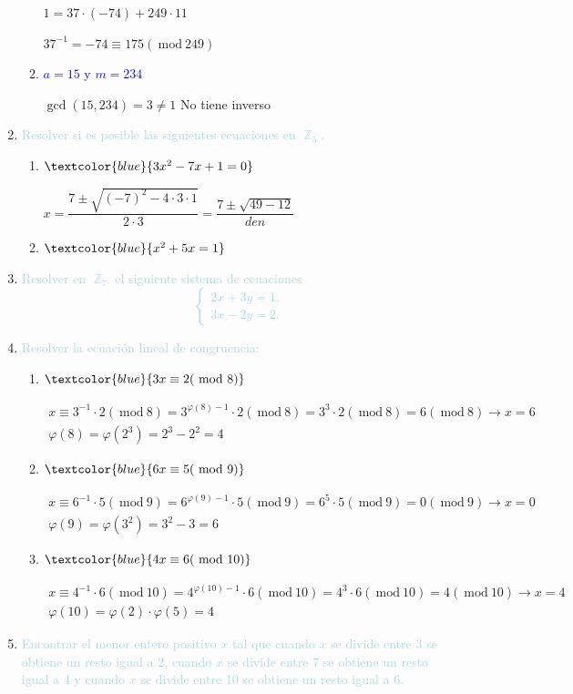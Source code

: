 \documentclass{article}
\newcommand{\lb}[1]{\textcolor{lightblue}{#1}}
\newcommand{\db}[1]{\textcolor{blue}{#1}}
\DeclareMathOperator{\Z}{\mathbb{Z}}
\renewcommand{\mod}{~\mathrm{mod}~}
\begin{document}
\begin{enumerate}[label=\color{red}\textbf{\arabic*)}, leftmargin=*]
\begin{enumerate}[label=\color{red}\alph*)]
        $1=37\cdot(-74)+249\cdot11$
        
        $37^{-1}=-74\equiv175(\mod249)$
		\item \db{$a=15$ y $m=234$}
        
        $\gcd(15,234)=3\neq1$ No tiene inverso
	\end{enumerate}
	\item \lb{Resolver si es posible las siguientes ecuaciones en $\Z_5$.}
	\begin{enumerate}[label=\color{red}\alph*)]
		\item $\db{3x^2-7x+1=0}$
        
        $x=\dfrac{7\pm\sqrt{(-7)^2-4\cdot3\cdot1}}{2\cdot3}=\dfrac{7\pm\sqrt{49-12}}{den}$
		\item $\db{x^2+5x=1}$
	\end{enumerate}
	
	\item \lb{Resolver en $\Z_7$ el siguiente sistema de ecuaciones \[ \begin{cases}
			2x+3y=1,\\
			3x-2y=2.
		\end{cases} \]}
	\item \lb{Resolver la ecuación lineal de congruencia:}
	\begin{enumerate}[label=\color{red}\alph*)]
		\item $\db{3x\equiv2(\mod 8)}$
		
		$\begin{array}{l}
			x\equiv3^{-1}\cdot2(\mod8)=3^{\varphi(8)-1}\cdot2(\mod8)=3^3\cdot2(\mod8)=6(\mod8)\longrightarrow x=6\\
			\varphi(8)=\varphi(2^3)=2^3-2^2=4
		\end{array}$
		
		\item $\db{6x\equiv 5(\mod 9)}$
		
		$\begin{array}{l}
			x\equiv6^{-1}\cdot5(\mod9)=6^{\varphi(9)-1}\cdot5(\mod9)=6^5\cdot5(\mod9)=0(\mod9)\longrightarrow x=0\\
			\varphi(9)=\varphi(3^2)=3^2-3=6
		\end{array}$
		\item $\db{4x\equiv6(\mod 10)}$
		
		$\begin{array}{l}
			x\equiv4^{-1}\cdot6(\mod10)=4^{\varphi(10)-1}\cdot6(\mod10)=4^3\cdot6(\mod10)=4(\mod10)\longrightarrow x=4\\
			\varphi(10)=\varphi(2)\cdot\varphi(5)=4
		\end{array}$
	\end{enumerate}
	\item \lb{Encontrar el menor entero positivo $x$ tal que cuando $x$ se divide entre 3 se obtiene un resto igual a 2, cuando $x$ se divide entre 7 se obtiene un resto igual a 4 y cuando $x$ se divide entre 10 se obtiene un resto igual a 6.}
    

\end{enumerate}
\end{document}
